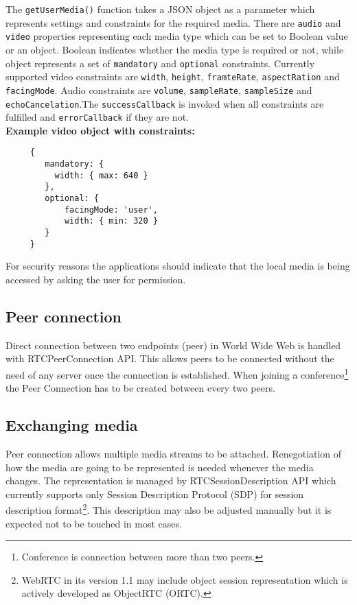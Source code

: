 The \verb|getUserMedia()| function takes a JSON object as a parameter which represents settings and constraints for the required media. There are \verb|audio| and \verb|video| properties representing each media type which can be set to Boolean value or an object. Boolean indicates whether the media type is required or not, while object represents a set of \verb|mandatory| and \verb|optional| constraints. Currently supported video constraints are \verb|width|, \verb|height|, \verb|framteRate|, \verb|aspectRation| and \verb|facingMode|. Audio constraints are \verb|volume|, \verb|sampleRate|, \verb|sampleSize| and \verb|echoCancelation|.The \verb|successCallback| is invoked when all constraints are fulfilled and \verb|errorCallback| if they are not.\\

\textbf{Example video object with constraints:}
\begin{verbatim}
     {
        mandatory: {
          width: { max: 640 }
        },
        optional: {
            facingMode: 'user',
            width: { min: 320 }
        }
     }
\end{verbatim}

For security reasons the applications should indicate that the local media is being accessed by asking the user for permission.


\subsection{Peer connection}
Direct connection between two endpoints (peer) in World Wide Web is handled with RTCPeerConnection API. This allows peers to be connected without the need of any server once the connection is established. When joining a conference\footnote{Conference is connection between more than two peers.} the Peer Connection has to be created between every two peers.


\subsection{Exchanging media}
Peer connection allows multiple media streams to be attached. Renegotiation of how the media are going to be represented is needed whenever the media changes. The representation is managed by RTCSessionDescription API which currently supports only Session Description Protocol (SDP) for session description format\footnote{WebRTC in its version 1.1 may include object session representation which is actively developed as ObjectRTC (ORTC).}. This description may also be adjusted manually but it is expected not to be touched in most cases.

